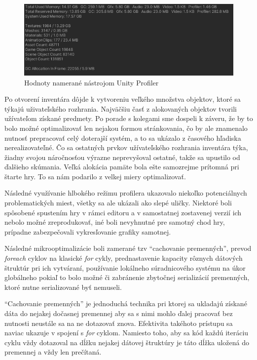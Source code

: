 \documentclass[slovak, bachelorpractice]{diploma}
\begin{document}
\begin{figure}[!htbp]
	\centering
	\includegraphics[width=1\textwidth]{Pictures/profiler.png}
	\caption{Hodnoty namerané nástrojom Unity Profiler}
	\label{pic:Prof}
\end{figure}

Po otvorení inventára dôjde k vytvoreniu veľkého množstva objektov, ktoré sa týkajú uživateľského rozhrania. Najväčšiu časť z alokovaných objektov tvorili užívateľom získané predmety. Po porade s kolegami sme dospeli k záveru, že by to bolo možné optimalizovať len nejakou formou stránkovania, čo by ale znamenalo nutnosť prepracovať celý doterajší systém, a to sa ukázalo z časového hľadiska nerealizovateľné. Čo sa ostatných prvkov užívateľského rozhrania inventára týka, žiadny svojou náročnosťou výrazne neprevyšoval ostatné, takže sa upustilo od ďalšieho skúmania. Veľká alokácia pamäte bola ešte samozrejme prítomná pri štarte hry. To sa nám podarilo z velkej miery optimalizovať.

Následné využívanie hlbokého režimu profilera ukazovalo niekoľko potenciálnych problematických miest, všetky sa ale ukázali ako slepé uličky. Niektoré boli spôsobené spustením hry v rámci editoru a v samostatnej zostavenej verzií ich nebolo možné zreprodukovať, iné boli nevyhnutné pre samotný chod hry, prípadne zabezpečovali vykresľovanie grafiky samotnej.

Následné mikrooptimalizácie boli zamerané tzv \enquote{cachovanie premenných}, prevod \textit{foreach} cyklov na klasické \textit{for} cykly, prednastavenie kapacity rôznych dátových štruktúr pri ich vytváraní, používanie lokálneho súradnicového systému na úkor globálneho pokiaľ to bolo možné či zabránenie zbytočnej serializácií premenných, ktoré nutne serializované byť nemuseli.

\enquote{Cachovanie premenných} je jednoduchá technika pri ktorej sa ukladajú získané dáta do nejakej dočasnej premennej aby sa s nimi mohlo ďalej pracovať bez nutnosti neustále sa na ne dotazovať znova. Efektivita takéhoto prístupu sa naviac ukazuje v spojení s \textit{for} cyklom. Namiesto toho, aby sa kód každú iteráciu cyklu vždy dotazoval na dĺžku nejakej dátovej štruktúry je táto dĺžka uložená do premennej a vždy len prečítaná.
\end{document}

